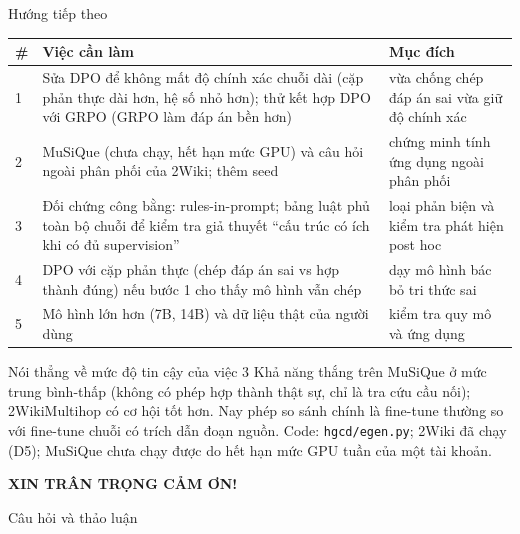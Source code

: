 \documentclass[aspectratio=169,t]{beamer}
\newcommand{\code}[1]{\texttt{#1}}
\begin{document}
\begin{frame}[shrink]{Hướng tiếp theo}
\scriptsize
\renewcommand{\arraystretch}{1.25}
\begin{tabularx}{\textwidth}{@{}P{0.7cm}YP{2.8cm}@{}}
\toprule
\textbf{\#} & \textbf{Việc cần làm} & \textbf{Mục đích}\\
 & Sửa DPO để không mất độ chính xác chuỗi dài (cặp phản thực dài hơn, hệ số nhỏ hơn); thử kết hợp DPO với GRPO (GRPO làm đáp án bền hơn) & vừa chống chép đáp án sai vừa giữ độ chính xác\\
2 & MuSiQue (chưa chạy, hết hạn mức GPU) và câu hỏi ngoài phân phối của 2Wiki; thêm seed & chứng minh tính ứng dụng ngoài phân phối\\
3 & Đối chứng công bằng: rules-in-prompt; bảng luật phủ toàn bộ chuỗi để kiểm tra giả thuyết ``cấu trúc có ích khi có đủ supervision'' & loại phản biện và kiểm tra phát hiện post hoc\\
4 & DPO với cặp phản thực (chép đáp án sai vs hợp thành đúng) nếu bước 1 cho thấy mô hình vẫn chép & dạy mô hình bác bỏ tri thức sai\\
5 & Mô hình lớn hơn (7B, 14B) và dữ liệu thật của người dùng & kiểm tra quy mô và ứng dụng\\
\bottomrule
\end{tabularx}
\par\vspace{4pt}
\begin{alertblock}{Nói thẳng về mức độ tin cậy của việc 3}
\scriptsize Khả năng thắng trên MuSiQue ở mức trung bình-thấp (không có phép hợp thành thật sự, chỉ là tra cứu cầu nối); 2WikiMultihop có cơ hội tốt hơn. Nay phép so sánh chính là fine-tune thường so với fine-tune chuỗi có trích dẫn đoạn nguồn. Code: \code{hgcd/egen.py}; 2Wiki đã chạy (D5); MuSiQue chưa chạy được do hết hạn mức GPU tuần của một tài khoản.
\end{alertblock}
\par\kern0pt
\end{frame}

\begin{frame}[c,noframenumbering]
\centering
{\Huge\bfseries\color{accentc}XIN TRÂN TRỌNG CẢM ƠN!\par}
\vspace{0.5cm}
{\large Câu hỏi và thảo luận\par}
\par\kern0pt
\end{frame}
\end{document}
